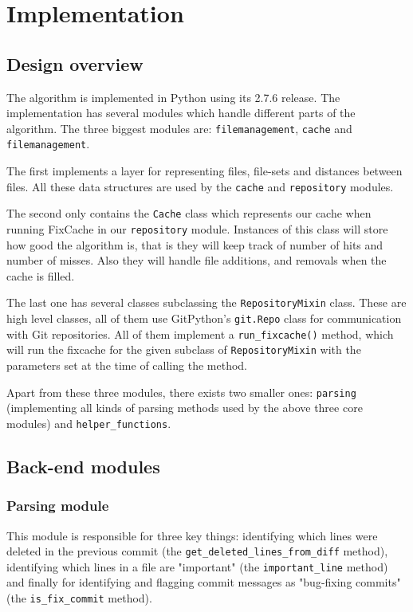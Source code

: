 \documentclass[12pt,twoside,notitlepage]{report}
\newcommand{\fxch}{FixCache }
\begin{document}
\chapter{Implementation}
\section{Design overview}

The algorithm is implemented in Python using its 2.7.6 release. The implementation has several modules which handle different parts of the algorithm. The three biggest modules are: \texttt{filemanagement}, \texttt{cache} and \texttt{filemanagement}. 

The first implements a layer for representing files, file-sets and distances between files. All these data structures are used by the \texttt{cache} and \texttt{repository} modules. 

The second only contains the \texttt{Cache} class which represents our cache when running \fxch in our \texttt{repository} module. Instances of this class will store how good the algorithm is, that is they will keep track of number of hits and number of misses. Also they will handle file additions, and removals when the cache is filled.

The last one has several classes subclassing the \texttt{RepositoryMixin} class. These are high level classes, all of them use GitPython's \texttt{git.Repo} class for communication with Git repositories. All of them implement a \texttt{run\_fixcache()} method, which will run the fixcache for the given subclass of \texttt{RepositoryMixin} with the parameters set at the time of calling the method. 

Apart from these three modules, there exists two smaller ones: \texttt{parsing} (implementing all kinds of parsing methods used by the above three core modules) and \texttt{helper\_functions}.
\section{Back-end modules}
\subsection{Parsing module}
This module is responsible for three key things: identifying which lines were deleted in the previous commit (the \texttt{get\_deleted\_lines\_from\_diff} method), identifying which lines in a file are "important" (the \texttt{important\_line} method) and finally for identifying and flagging commit messages as "bug-fixing commits" (the \texttt{is\_fix\_commit} method).
\end{document}
